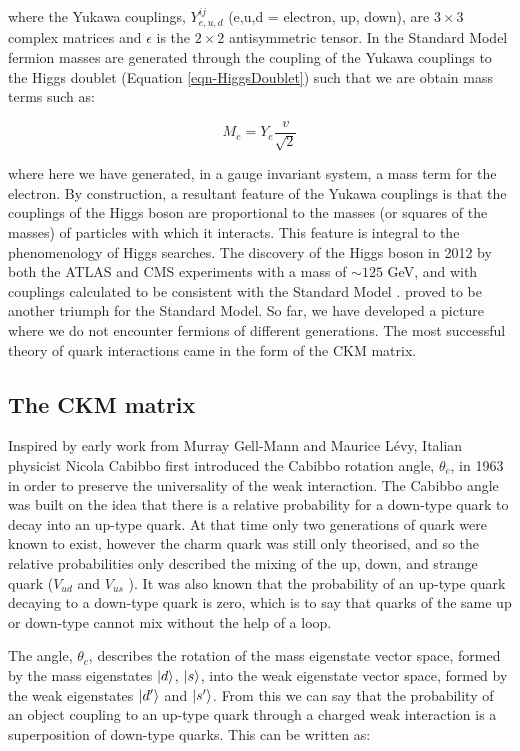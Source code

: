 where the Yukawa couplings, $Y^{ij}_{e,u,d}$ (e,u,d = electron, up, down), are $3\times3$ complex matrices and $\epsilon$ is the $2\times2$ antisymmetric tensor. In the Standard Model fermion masses are generated through the coupling of the Yukawa couplings to the Higgs doublet (Equation \ref{eqn-HiggsDoublet}) such that we are obtain mass terms such as:

\begin{equation}
M_e = Y_e\frac{v}{\sqrt{2}}
\end{equation}

where here we have generated, in a gauge invariant system, a mass term for the electron. By construction, a resultant feature of the Yukawa couplings is that the couplings of the Higgs boson are proportional to the masses (or squares of the masses) of particles with which it interacts. This feature is integral to the phenomenology of Higgs searches. The discovery of the Higgs boson in 2012 by both the ATLAS \cite{Aad:2012tfa} and CMS \cite{b846af59f42d440a9058d93ed5df44cf} experiments with a mass of $\sim125$ GeV, and with couplings calculated to be consistent with the Standard Model \cite{Chatrchyan:2013lba, Aad:2013wqa}. proved to be another triumph for the Standard Model. So far, we have developed a picture where we do not encounter fermions of different generations. The most successful theory of quark interactions came in the form of the CKM matrix.

\subsection{The CKM matrix}

Inspired by early work from Murray Gell-Mann and Maurice L\'{e}vy, Italian physicist Nicola Cabibbo first introduced the Cabibbo rotation angle, $\theta_c$, in 1963 \cite{PhysRevLett.10.531} in order to preserve the universality of the weak interaction. The Cabibbo angle was built on the idea 
that there is a relative probability for a down-type quark to decay into an up-type quark. At that time only two generations of quark were 
known to exist, however the charm quark was still only theorised, and so the relative probabilities only described the mixing of the up, down,
and strange quark ($V_{ud}$ and $V_{us}$ ). It was also known that the probability of an up-type quark decaying to a down-type quark is zero, 
which is to say that quarks of the same up or down-type cannot mix without the help of a loop.

The angle, $\theta_c$, describes the rotation of the mass eigenstate vector space, formed by the mass eigenstates $\ket{d}$, $\ket{s}$, into the 
weak eigenstate vector space, formed by the weak eigenstates $\ket{d'}$ and $\ket{s'}$. From this we can say that the probability of an object 
coupling to an up-type quark through a charged weak interaction is a superposition of down-type quarks. This can be written as:

